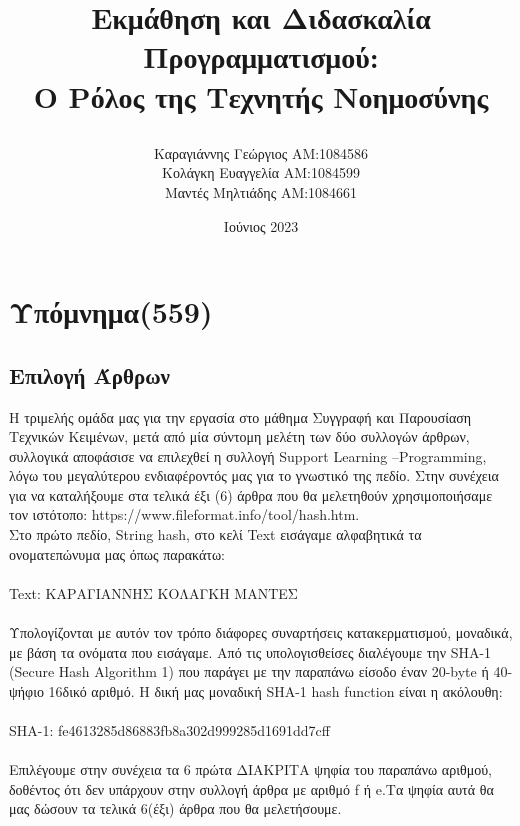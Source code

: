 \documentclass{report}
\title{
\textbf{Εκμάθηση και Διδασκαλία Προγραμματισμού:\\ 
O Ρόλος της Τεχνητής Νοημοσύνης}
\author{Καραγιάννης Γεώργιος ΑΜ:1084586 \\Κολάγκη Ευαγγελία  ΑΜ:1084599 \\Μαντές Μηλτιάδης ΑΜ:1084661} }
\date{\LARGE \session Ιούνιος 2023}
\begin{document}
\maketitle

\tableofcontents
{}
\chapter{Υπόμνημα(559)}
\section{Επιλογή Άρθρων}
Η τριμελής ομάδα μας για την εργασία στο μάθημα Συγγραφή και Παρουσίαση Τεχνικών Κειμένων, μετά από μία σύντομη μελέτη των δύο συλλογών άρθρων, συλλογικά αποφάσισε να επιλεχθεί η συλλογή Support Learning –Programming, λόγω του μεγαλύτερου ενδιαφέροντός μας για το γνωστικό της πεδίο. Στην συνέχεια για να καταλήξουμε στα τελικά έξι (6) άρθρα που θα μελετηθούν χρησιμοποιήσαμε τον ιστότοπο: 
 https://www.fileformat.info/tool/hash.htm. 
 \\Στο πρώτο πεδίο, String hash,  στο κελί Text εισάγαμε αλφαβητικά τα ονοματεπώνυμα μας όπως παρακάτω: \\
\\Text: ΚΑΡΑΓΙΑΝΝΗΣ ΚΟΛΑΓΚΗ ΜΑΝΤΕΣ\\ 
\\Υπολογίζονται με αυτόν τον τρόπο διάφορες συναρτήσεις κατακερματισμού, μοναδικά, με βάση τα ονόματα που εισάγαμε. Από τις υπολογισθείσες διαλέγουμε την SHA-1 (Secure Hash Algorithm 1) που παράγει με την παραπάνω είσοδο έναν 20-byte ή 40-ψήφιο 16δικό αριθμό. Η δική μας μοναδική SHA-1 hash function είναι η ακόλουθη:\\
 \\ SHA-1: fe4613285d86883fb8a302d999285d1691dd7cff
\\
\\Επιλέγουμε στην συνέχεια τα 6 πρώτα ΔΙΑΚΡΙΤΑ ψηφία του παραπάνω αριθμού, δοθέντος ότι δεν υπάρχουν στην συλλογή άρθρα με αριθμό f ή e.Τα ψηφία αυτά θα μας δώσουν τα τελικά 6(έξι) άρθρα που θα μελετήσουμε. \\
\end{document}
